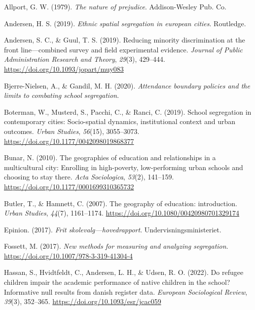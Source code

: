 \documentclass[
]{book}
\newlength{\cslhangindent}
\newlength{\cslentryspacingunit} %
\newenvironment{CSLReferences}[2] %
 {%
  \setlength{\parindent}{0pt}
  \ifodd #1
  \let\oldpar\par
  \def\par{\hangindent=\cslhangindent\oldpar}
  \fi
  \setlength{\parskip}{#2\cslentryspacingunit}
 }%
 {}
\begin{document}
\hypertarget{refs}{}
\begin{CSLReferences}{1}{0}
\leavevmode{}%
Allport, G. W. (1979). \emph{The nature of prejudice}. Addison-Wesley Pub. Co.

\leavevmode{}%
Andersen, H. S. (2019). \emph{Ethnic spatial segregation in european cities}. Routledge.

\leavevmode{}%
Andersen, S. C., \& Guul, T. S. (2019). Reducing minority discrimination at the front line---combined survey and field experimental evidence. \emph{Journal of Public Administration Research and Theory}, \emph{29}(3), 429--444. \url{https://doi.org/10.1093/jopart/muy083}

\leavevmode{}%
Bjerre-Nielsen, A., \& Gandil, M. H. (2020). \emph{Attendance boundary policies and the limits to combating school segregation}.

\leavevmode{}%
Boterman, W., Musterd, S., Pacchi, C., \& Ranci, C. (2019). School segregation in contemporary cities: Socio-spatial dynamics, institutional context and urban outcomes. \emph{Urban Studies}, \emph{56}(15), 3055--3073. \url{https://doi.org/10.1177/0042098019868377}

\leavevmode{}%
Bunar, N. (2010). The geographies of education and relationships in a multicultural city: Enrolling in high-poverty, low-performing urban schools and choosing to stay there. \emph{Acta Sociologica}, \emph{53}(2), 141--159. \url{https://doi.org/10.1177/0001699310365732}

\leavevmode{}%
Butler, T., \& Hamnett, C. (2007). The geography of education: introduction. \emph{Urban Studies}, \emph{44}(7), 1161--1174. \url{https://doi.org/10.1080/00420980701329174}

\leavevmode{}%
Epinion. (2017). \emph{Frit skolevalg---hovedrapport}. Undervisningsministeriet.

\leavevmode{}%
Fossett, M. (2017). \emph{New methods for measuring and analyzing segregation}. \url{https://doi.org/10.1007/978-3-319-41304-4}

\leavevmode{}%
Hassan, S., Hvidtfeldt, C., Andersen, L. H., \& Udsen, R. O. (2022). Do refugee children impair the academic performance of native children in the school? Informative null results from danish register data. \emph{European Sociological Review}, \emph{39}(3), 352--365. \url{https://doi.org/10.1093/esr/jcac059}


\end{CSLReferences}
\end{document}
